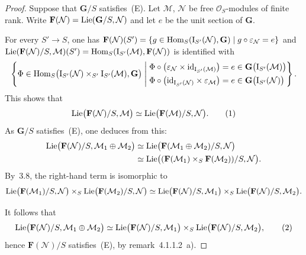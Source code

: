 \begin{proof}
Suppose that \(\mathbf{G}/S\) satisfies~(E). Let \(\mathcal{M}\), \(\mathcal{N}\) be
free \(\mathcal{O}_{S}\)-modules of finite rank. Write
\(\mathbf{F}(\mathcal{N})=\operatorname{Lie}(\mathbf{G}/S,\mathcal{N})\) and let \(e\) be the unit
section of \(\mathbf{G}\).

For every \(S'\to S\), one has
\(\mathbf{F}(\mathcal{N})(S')=\{g\in\operatorname{Hom}_{S}(\mathrm{I}_{S'}(\mathcal{N}),\mathbf{G})
\mid g\circ\varepsilon_{\mathcal{N}}=e\}\) and
\(\operatorname{Lie}(\mathbf{F}(\mathcal{N})/S,\mathcal{M})(S')
=\operatorname{Hom}_{S}(\mathrm{I}_{S'}(\mathcal{M}),\mathbf{F}(\mathcal{N}))\) is identified with
\[
\left\{
\Phi\in\operatorname{Hom}_{S}\bigl(\mathrm{I}_{S'}(\mathcal{N})\times_{S'}\mathrm{I}_{S'}(\mathcal{M}),
\mathbf{G}\bigr)
\;\middle|\;
\begin{aligned}
&\Phi\circ\bigl(\varepsilon_{\mathcal{N}}\times\mathrm{id}_{\mathrm{I}_{S'}(\mathcal{M})}\bigr)
  =e\in\mathbf{G}\bigl(\mathrm{I}_{S'}(\mathcal{M})\bigr)\\
&\Phi\circ\bigl(\mathrm{id}_{\mathrm{I}_{S'}(\mathcal{N})}\times\varepsilon_{\mathcal{M}}\bigr)
  =e\in\mathbf{G}\bigl(\mathrm{I}_{S'}(\mathcal{N})\bigr)
\end{aligned}
\right\}.
\]
This shows that
\begin{equation}
\operatorname{Lie}\bigl(\mathbf{F}(\mathcal{N})/S,\mathcal{M}\bigr)
  \simeq\operatorname{Lie}\bigl(\mathbf{F}(\mathcal{M})/S,\mathcal{N}\bigr).
\tag{1}
\end{equation}
As \(\mathbf{G}/S\) satisfies~(E), one deduces from this:
\[
\begin{aligned}
\operatorname{Lie}\bigl(\mathbf{F}(\mathcal{N})/S,\mathcal{M}_{1}\oplus\mathcal{M}_{2}\bigr)
  &\simeq\operatorname{Lie}\bigl(\mathbf{F}(\mathcal{M}_{1}\oplus\mathcal{M}_{2})/S,\mathcal{N}\bigr)\\
  &\simeq\operatorname{Lie}\bigl((\mathbf{F}(\mathcal{M}_{1})\times_{S}\mathbf{F}(\mathcal{M}_{2}))/S,
    \mathcal{N}\bigr).
\end{aligned}
\]
By~3.8, the right-hand term is isomorphic to
\[
\operatorname{Lie}\bigl(\mathbf{F}(\mathcal{M}_{1})/S,\mathcal{N}\bigr)
  \times_{S}
\operatorname{Lie}\bigl(\mathbf{F}(\mathcal{M}_{2})/S,\mathcal{N}\bigr)
  \simeq
\operatorname{Lie}\bigl(\mathbf{F}(\mathcal{N})/S,\mathcal{M}_{1}\bigr)
  \times_{S}
\operatorname{Lie}\bigl(\mathbf{F}(\mathcal{N})/S,\mathcal{M}_{2}\bigr).
\]

It follows that
\begin{equation}
\operatorname{Lie}\bigl(\mathbf{F}(\mathcal{N})/S,\mathcal{M}_{1}\oplus\mathcal{M}_{2}\bigr)
  \simeq
\operatorname{Lie}\bigl(\mathbf{F}(\mathcal{N})/S,\mathcal{M}_{1}\bigr)
  \times_{S}
\operatorname{Lie}\bigl(\mathbf{F}(\mathcal{N})/S,\mathcal{M}_{2}\bigr),
\tag{2}
\end{equation}
hence \(\mathbf{F}(\mathcal{N})/S\) satisfies~(E), by remark~4.1.1.2~a).


\end{proof}
